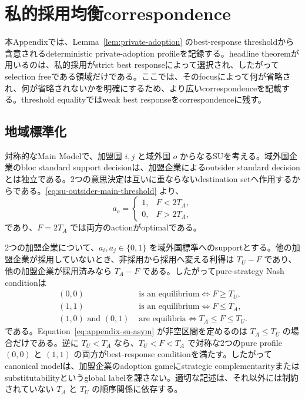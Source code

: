 \section{私的採用均衡correspondence}
\label{app:adoption-equilibria}

本Appendixでは、Lemma~\ref{lem:private-adoption} のbest-response thresholdから含意されるdeterministic private-adoption profileを記録する。headline theoremが用いるのは、私的採用がstrict best responseによって選択され、したがってselection freeである領域だけである。ここでは、そのfocusによって何が省略され、何が省略されないかを明確にするため、より広いcorrespondenceを記載する。threshold equalityではweak best responseをcorrespondenceに残す。

\subsection{地域標準化}

対称的なMain Modelで、加盟国 $i,j$ と域外国 $o$ からなるSUを考える。域外国企業のbloc standard support decisionは、加盟企業によるoutsider standard decisionとは独立である。2つの意思決定は互いに重ならないdestination setへ作用するからである。\eqref{eq:su-outsider-main-threshold} より、
\[
a_o=
\begin{cases}
1,&F<2T_A,\\
0,&F>2T_A,
\end{cases}
\]
であり、$F=2T_A$ では両方のactionがoptimalである。

2つの加盟企業について、$a_i,a_j\in\{0,1\}$ を域外国標準へのsupportとする。他の加盟企業が採用していないとき、非採用から採用へ変える利得は $T_U-F$ であり、他の加盟企業が採用済みなら $T_A-F$ である。したがってpure-strategy Nash conditionは
\begin{align}
(0,0)&\text{ is an equilibrium}\iff F\ge T_U,\label{eq:appendix-su-00}\\
(1,1)&\text{ is an equilibrium}\iff F\le T_A,\label{eq:appendix-su-11}\\
(1,0)\text{ and }(0,1)&\text{ are equilibria}\iff T_A\le F\le T_U.\label{eq:appendix-su-asym}
\end{align}
である。Equation~\eqref{eq:appendix-su-asym} が非空区間を定めるのは $T_A\le T_U$ の場合だけである。逆に $T_U<T_A$ なら、$T_U<F<T_A$ で対称な2つのpure profile $(0,0)$ と $(1,1)$ の両方がbest-response conditionを満たす。したがってcanonical modelは、加盟企業のadoption gameにstrategic complementarityまたはsubstitutabilityというglobal labelを課さない。適切な記述は、それ以外には制約されていない $T_A$ と $T_U$ の順序関係に依存する。

